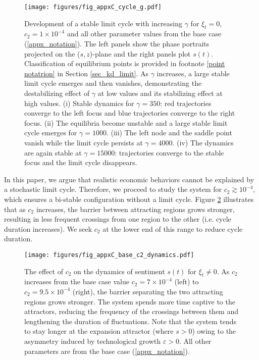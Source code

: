 \begin{figure}
	\centering
	\texttt{[image: figures/fig\_appxC\_cycle\_g.pdf]}
	\label{fig_appxC_cycle_g}
	\caption{Development of a stable limit cycle with increasing $\gamma$ for $\xi_t=0$, $c_2=1\times10^{-4}$ and all other parameter values from the base case (\ref{appx_notation}). The left panels show the phase portraits projected on the ($s,z$)-plane and the right panels plot $s(t)$. Classification of equilibrium points is provided in footnote \ref{point notatrion} in Section \ref{sec_kd_limit}. As $\gamma$ increases, a large stable limit cycle emerges and then vanishes, demonstrating the destabilizing effect of $\gamma$ at low values and its stabilizing effect at high values. (i) Stable dynamics for $\gamma=350$: red trajectories converge to the left focus and blue trajectories converge to the right focus. (ii) The equilibria become unstable and a large stable limit cycle emerges for $\gamma=1000$. (iii) The left node and the saddle point vanish while the limit cycle persists at $\gamma=4000$. (iv) The dynamics are again stable at $\gamma=15000$: trajectories converge to the stable focus and the limit cycle disappears.} 
	\label{fig_appxC_cycle}
\end{figure}

In this paper, we argue that realistic economic behaviors cannot be explained by a stochastic limit cycle. Therefore, we proceed to study the system for $c_2\gtrsim10^{-4}$, which ensures a bi-stable configuration without a limit cycle. Figure \ref{fig_appxC_base_c2_dynamics} illustrates that as $c_2$ increases, the barrier between attracting regions grows stronger, resulting in less frequent crossings from one region to the other (i.e. cycle duration increases). We seek $c_2$ at the lower end of this range to reduce cycle duration. %

\begin{figure}
    \centering
    \texttt{[image: figures/fig\_appxC\_base\_c2\_dynamics.pdf]}
    \caption{The effect of $c_2$ on the dynamics of sentiment $s(t)$ for $\xi_t\neq0$. As $c_2$ increases from the base case value $c_2=7\times10^{-4}$ (left) to $c_2=9.5\times10^{-4}$ (right), the barrier separating the two attracting regions grows stronger. The system spends more time captive to the attractors, reducing the frequency of the crossings between them and lengthening the duration of fluctuations. Note that the system tends to stay longer at the expansion attractor (where $s>0$) owing to the asymmetry induced by technological growth $\varepsilon>0$. All other parameters are from the base case (\ref{appx_notation}).}
    \label{fig_appxC_base_c2_dynamics}
\end{figure}

